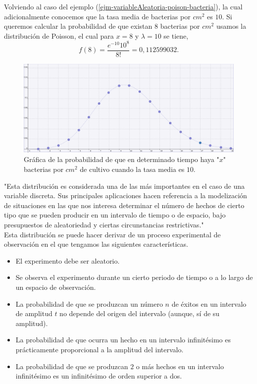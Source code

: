 \begin{Ejm}
    Volviendo al caso del ejemplo (\ref{ejm-variableAleatoria-poison-bacteria}), la cual adicionalmente conocemos que la tasa media de bacterias por $cm^2$ es $10$. Si queremos calcular la probabilidad de que existan $8$ bacterias por $cm^2$ usamos la distribución de Poisson, el cual para $x=8$ y $\lambda = 10$ se tiene,
    $$f(8)=\frac{e^{-10} 10^{8}}{8!}=  0,112599032. $$ 
    \begin{figure}
        \includegraphics[width=15cm]{Cap1-Probabilidad/img/poisson.png}
        \caption{Gráfica de la probabilidad de que en determinado tiempo haya "$x$" bacterias por $cm^2$ de cultivo cuando la tasa media es $10$.}
    \end{figure}
\end{Ejm}
"Esta distribución es considerada una de las más importantes en el caso de una variable discreta. Sus principales aplicaciones hacen referencia a la modelización de situaciones en las que nos interesa determinar el número de hechos de cierto tipo que se pueden producir en un intervalo de tiempo o de espacio, bajo presupuestos de aleatoriedad y ciertas circunstancias restrictivas."\\
Esta distribución se puede hacer derivar de un proceso experimental de observación en el que tengamos las siguientes características.
\begin{itemize}
    \item El experimento debe ser aleatorio.
    \item Se observa el experimento durante un cierto periodo de tiempo o a lo largo de un espacio de observación.
    \item La probabilidad de que se produzcan un número $n$ de éxitos en un intervalo de amplitud $t$ no depende del origen del intervalo (aunque, sí de su amplitud).
    \item La probabilidad de que ocurra un hecho en un intervalo infinitésimo es prácticamente proporcional a la amplitud del intervalo.
    \item La probabilidad de que se produzcan $2$ o más hechos en un intervalo infinitésimo es un infinitésimo de orden superior a dos.
\end{itemize}
